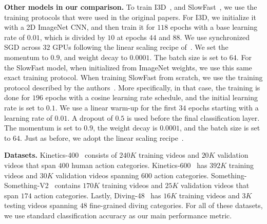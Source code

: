 \documentclass{article}
\begin{document}
\textbf{Other models in our comparison.} To train I3D~\cite{DBLP:conf/cvpr/CarreiraZ17}, and SlowFast~\cite{slowfast}, we use the training protocols that were used in the original papers. For I3D, we initialize it with a 2D ImageNet CNN, and then train it for $118$ epochs with a base learning rate of $0.01$, which is divided by $10$ at epochs $44$ and $88$. We use synchronized SGD across $32$ GPUs following the linear scaling recipe of~\citet{goyal2017imagenet1hr}. We set the momentum to $0.9$, and weight decay to $0.0001$. The batch size is set to $64$. For the SlowFast model, when initialized from ImageNet weights, we use this same exact training protocol. When training SlowFast from scratch, we use the training protocol described by the authors~\cite{slowfast}. More specifically, in that case, the training is done for $196$ epochs with a cosine learning rate schedule, and the initial learning rate is set to $0.1$. We use a linear warm-up for the first $34$ epochs starting with a learning rate of $0.01$. A dropout of $0.5$ is used before the final classification layer. The momentum is set to $0.9$, the weight decay is $0.0001$, and the batch size is set to $64$. Just as before, we adopt the linear scaling recipe~\cite{goyal2017imagenet1hr}.

\textbf{Datasets.} Kinetics-400~\cite{DBLP:conf/cvpr/CarreiraZ17} consists of $240K$ training
videos and $20K$ validation videos that span $400$ human action categories. Kinetics-600~\cite{DBLP:journals/corr/abs-1808-01340} has  $392K$ training videos and $30K$ validation videos spanning $600$ action categories. Something-Something-V2~\cite{DBLP:journals/corr/GoyalKMMWKHFYMH17} contains $170K$ training videos and $25K$ validation videos that span $174$ action categories. Lastly, Diving-48~\cite{Li_2018_ECCV} has $16K$ training videos and $3K$ testing videos spanning $48$ fine-grained diving categories. For all of these datasets, we use standard classification accuracy as our main performance metric.






\end{document}
